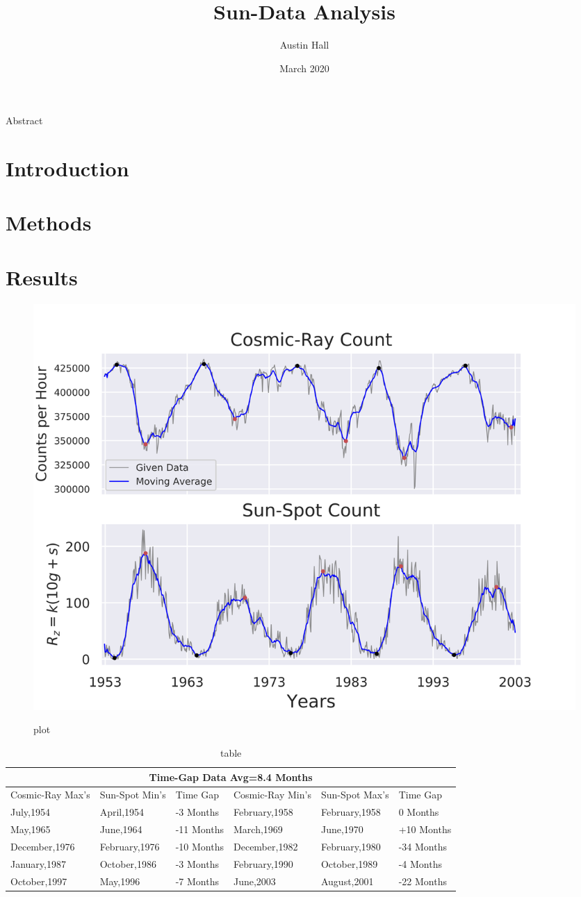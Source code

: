 \documentclass{article}
\author{Austin Hall}
\date{March 2020}
\title{\huge Sun-Data Analysis}
\begin{document}
\maketitle
\begin{center}
{\LARGE Abstract}\\
\end{center}

\newpage
\section{Introduction}


\newpage
\section{Methods}


\newpage
\section{Results}
\begin{figure}[h!]
\centering
\caption{plot}
\includegraphics[scale=0.7]{plot.png}
\label{fig:sundata}
\end{figure}
\begin{table}[h!]
 \centering
 \small
 \caption{table}
 \label{tbl:timelag}
 \begin{tabular}{| p{2cm} |p{2cm} |p{1cm}||p{2cm}|p{2cm}|p{1cm}|  }
  \hline
  \multicolumn{6}{|c|}{Time-Gap Data Avg=8.4 Months} \\
  \hline
  Cosmic-Ray Max's&Sun-Spot Min's&Time Gap&Cosmic-Ray Min's&Sun-Spot Max's&Time Gap\\
  \hline
  July,1954&April,1954&-3 Months&February,1958&February,1958&0 Months\\
  May,1965&June,1964&-11 Months&March,1969&June,1970&+10 Months\\
  December,1976&February,1976&-10 Months&December,1982&February,1980&-34 Months\\
  January,1987&October,1986&-3 Months&February,1990&October,1989&-4 Months\\
  October,1997&May,1996&-7 Months&June,2003&August,2001&-22 Months\\
  \hline
 \end{tabular}
\end{table}
\newpage
\end{document}
